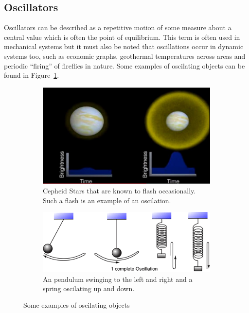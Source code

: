 \label{sec:kuramoto}

\subsection{Oscillators}
Oscillators can be described as a repetitive motion of some measure about a central value which is often the point of equilibrium. This term is often used in mechanical systems but it must also be noted that oscillations occur in dynamic systems too, such as economic graphs, geothermal temperatures across areas and periodic ``firing'' of fireflies in nature. Some examples of oscilating objects can be found in Figure~\ref{fig:intro_samples}. 

\begin{figure}[h]
\centering
\begin{subfigure}{.4\textwidth}
  \centering
  \includegraphics[width=\textwidth]{imgs/cepheid}
  \caption{Cepheid Stars that are known to flash occasionally. Such a flash is an example of an oscilation. }
\end{subfigure}%
\space\space\space
\begin{subfigure}{.5\textwidth}
  \centering
  \includegraphics[width=\textwidth]{imgs/oscillation}
  \caption{An pendulum swinging to the left and right and a spring oscilating up and down. }
\end{subfigure}
\caption{Some examples of oscilating objects}
\label{fig:intro_samples}
\end{figure}


